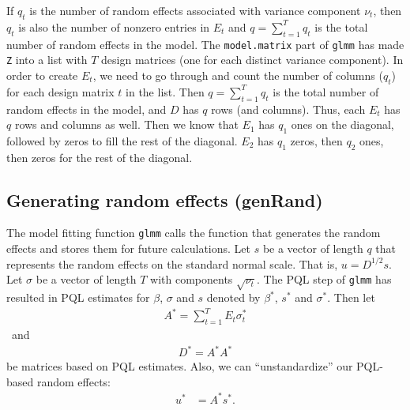 \documentclass{article}
\begin{document}
If $q_t$ is the number of random effects associated with variance component $\nu_t$, then $q_t$ is also the number of nonzero entries in $E_t$ and $q=\sum_{t=1}^T q_t$ is the total number of random effects in the model.  
The \texttt{model.matrix} part of \texttt{glmm} has made  \texttt{Z} into a list with $T$ design matrices (one for each distinct variance component).  In order to create $E_t$, we need to go through and count the  number of columns ($q_t$) for each design matrix $t$ in the list.
 Then $q=\sum_{t=1}^T q_t$ is the total number of random effects in the model, and $D$  has $q$ rows (and columns). Thus, each $E_t$  has $q$ rows and columns as well.  Then we know that $E_1$ has $q_1$ ones on the diagonal, followed by zeros to fill the rest of the diagonal.  $E_2$ has $q_1$ zeros, then $q_2$ ones, then zeros for the rest of the diagonal.



\subsection{Generating random effects (genRand)}\label{sec:genRand}
The model fitting function \texttt{glmm}  calls the function that generates the random effects and  stores them for future calculations. Let $s$ be a vector of length $q$ that represents the random effects on the standard normal scale. That is, $u= D^{1/2}s$. Let $\sigma$ be a vector of length $T$ with components $\sqrt{\nu_t}$.  The  PQL step of \texttt{glmm} has resulted in PQL estimates for $\beta$, $\sigma$ and  $s$ denoted by $\beta^*$, $s^*$ and $\sigma^*$. Then let
\begin{align}
A^*=\sum_{t=1}^T E_t \sigma^*_t
\end{align}\
and
\begin{align}
 D^* =A^*A^*
\end{align}
be matrices based on PQL estimates. Also, we can ``unstandardize'' our PQL-based random effects:
\begin{align}
u^*&=A^*s^*.
\end{align}
\end{document}
